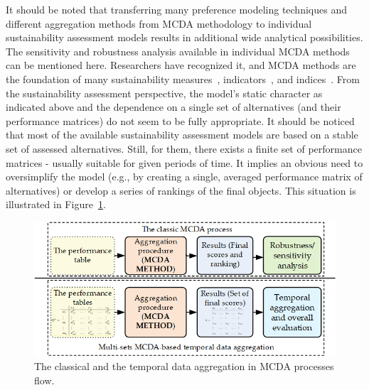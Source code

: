 \documentclass[5p,times]{elsarticle}
\begin{document}
It should be noted that transferring many preference modeling techniques and different aggregation methods from MCDA methodology to individual sustainability assessment models results in additional wide analytical possibilities. The sensitivity and robustness analysis available in individual MCDA methods can be mentioned here. Researchers have recognized it, and MCDA methods are the foundation of many sustainability measures~\cite{khan2020sustainability}, indicators~\cite{gwerder2019life}, and indices~\cite{boggia2018spatial}. From the sustainability assessment perspective, the model's static character as indicated above and the dependence on a single set of alternatives (and their performance matrices) do not seem to be fully appropriate. It should be noticed that most of the available sustainability assessment models are based on a stable set of assessed alternatives. Still, for them, there exists a finite set of performance matrices - usually suitable for given periods of time. It implies an obvious need to oversimplify the model (e.g., by creating a single, averaged performance matrix of alternatives) or develop a series of rankings of the final objects. This situation is illustrated in Figure~\ref{fig:frameworkZero}. 
%
\begin{figure}[H]
    \centering
    \includegraphics[width=\linewidth]{Fig0Daria.png}
    \caption{The classical and the temporal data aggregation in MCDA processes flow.}
    \label{fig:frameworkZero}
\end{figure}
\end{document}
